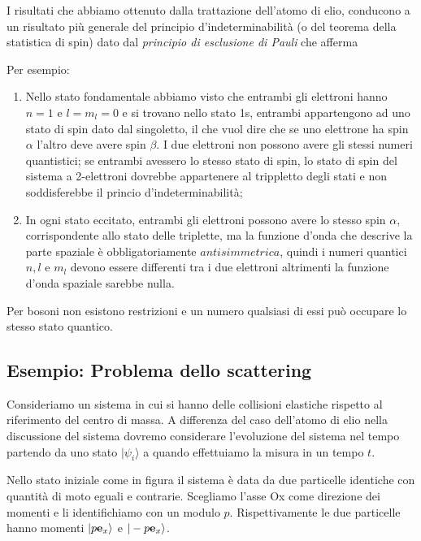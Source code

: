 I risultati che abbiamo ottenuto dalla trattazione dell'atomo di elio, conducono a un risultato pi\`u generale del principio d'indeterminabilit\`a (o del teorema della statistica di spin) dato dal \textit{principio di esclusione di Pauli} che afferma 
\begin{center}
\end{center}
Per esempio:
\begin{enumerate}
	\item Nello stato fondamentale abbiamo visto che entrambi gli elettroni hanno $n=1$ e $l=m_l =0$ e si trovano nello stato 1s, entrambi appartengono ad uno stato di spin dato dal singoletto, il che vuol dire che se uno elettrone ha spin $\alpha$ l'altro deve avere spin $\beta$. I due elettroni non possono avere gli stessi numeri quantistici; se entrambi avessero lo stesso stato di spin, lo stato di spin del sistema a 2-elettroni dovrebbe appartenere al trippletto degli stati e non soddisferebbe il princio d'indeterminabilit\`a;
	\item In ogni stato eccitato, entrambi gli elettroni possono avere lo stesso spin $\alpha$, corrispondente allo stato delle triplette, ma la funzione d'onda che descrive la parte spaziale \`e obbligatoriamente $antisimmetrica$, quindi i numeri quantici $n,l$ e $m_l$ devono essere differenti tra i due elettroni altrimenti la funzione d'onda spaziale sarebbe nulla.
\end{enumerate}
Per bosoni non esistono restrizioni e un numero qualsiasi di essi pu\`o occupare lo stesso stato quantico.

\subsection{Esempio: Problema dello scattering}

Consideriamo un sistema in cui si hanno delle collisioni elastiche rispetto al riferimento del centro di massa. A differenza del caso dell'atomo di elio nella discussione del sistema dovremo considerare  l'evoluzione del sistema nel tempo partendo da uno stato $|\psi_i \rangle$ a quando effettuiamo la misura in un tempo $t$. 

Nello stato iniziale come in figura il sistema \`e data da due particelle identiche con quantit\`a di moto eguali e contrarie. Scegliamo l'asse Ox  come direzione dei momenti  e li identifichiamo con un modulo $p$. Rispettivamente le due particelle hanno momenti $|p\bold{e}_x \rangle$ e $|-p \bold{e}_x \rangle$.
\newpage


